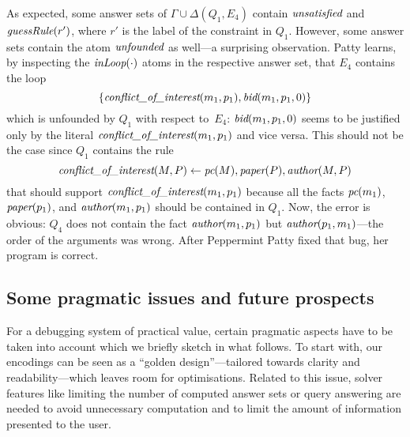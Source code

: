 \documentclass{tlp}
\newcommand{\reif}[1]{\Delta(#1)}
\newcommand{\wrt}{with respect to}
\renewcommand{\mathit}[1]{{\text{\it{#1}}}}
\begin{document}
As expected, some answer sets of $\Gamma \cup \reif{Q_{1},E_{4}}$ contain 
 $\mathit{unsatisfied}$ and $\mathit{guessRule}(r')$, where $r'$ is the label of the constraint in $Q_{1}$. However, some answer sets contain the atom $\mathit{unfounded}$ 
as well---a surprising observation. Patty learns, by inspecting the $\mathit{inLoop}(\cdot)$ atoms in the respective answer set, that $E_{4}$ contains the loop 
$$\{\mathit{conflict\_of\_interest}(m_1,p_1),\mathit{bid}(m_1,p_1,0)\}$$
which is unfounded by $Q_{1}$ \wrt\ $E_{4}$:  $\mathit{bid}(m_1,p_1,0)$ seems to be justified only by the literal 
$\mathit{conflict\_of\_interest}(m_1,p_1)$ and vice versa. 
This should not be the case since $Q_{1}$ contains the rule 
$$\mathit{conflict\_of\_interest}(M,P)  \leftarrow \mathit{pc}(M), \mathit{paper}(P), \mathit{author}(M,P)$$
that should support $\mathit{conflict\_of\_interest}(m_1,p_1)$ because all the facts $\mathit{pc}(m_1)$, $\mathit{paper}(p_1)$, and $\mathit{author}(m_1,p_1)$ should
be contained in $Q_{1}$. Now, the error is obvious: $Q_{4}$ does not contain the fact $\mathit{author}(m_1,p_1)$ but $\mathit{author}(p_1,m_1)$---the order of the arguments was wrong.
After Peppermint Patty fixed that bug, her program is correct.  

\subsection{Some pragmatic issues and future prospects}


For a debugging system of practical value, certain pragmatic aspects have to be taken into account which we briefly sketch in what follows.
To start with, our encodings can be seen as a ``golden design''---tailored towards
clarity and readability---which leaves room for optimisations. 
Related to this issue, solver features like limiting the number of computed answer sets or query answering 
are needed to avoid unnecessary computation and to limit the amount of information presented to the user. 
\end{document}
